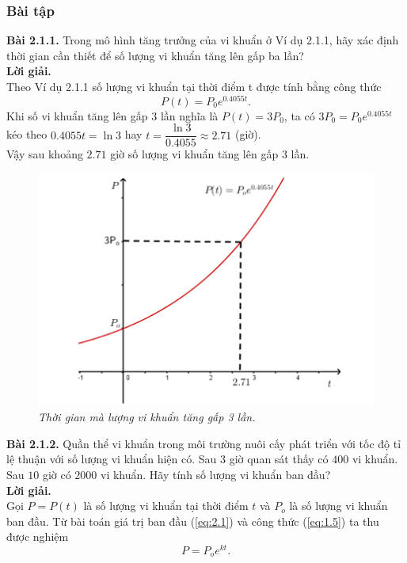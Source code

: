 \subsubsection{Bài tập}
\noindent\textbf{Bài 2.1.1.} Trong mô hình tăng trưởng của vi khuẩn ở Ví dụ 2.1.1, hãy xác định thời gian cần thiết để số lượng vi khuẩn tăng lên gấp ba lần?\\
\textbf{Lời giải. }\\
Theo Ví dụ 2.1.1 số lượng vi khuẩn tại thời điểm t được tính bằng công thức $$P(t)={{P}_{0}}{{e}^{0.4055t}}.$$
Khi số vi khuẩn tăng lên gấp $3$ lần nghĩa là $P(t)=3{{P}_{0}}$, ta có $3{{P}_{0}}={{P}_{0}}{{e}^{0.4055t}}$ kéo theo $0.4055t = \ln 3$ hay $t=\dfrac{\ln 3}{0.4055}\approx 2.71$ (giờ).\\
Vậy sau khoảng $2.71$ giờ số lượng vi khuẩn tăng lên gấp $3$ lần.
\begin{figure}[H]
	\centering
	\includegraphics[scale=0.55]{Images/hinh_2_1.png}
	\caption[Thời gian mà lượng vi khuẩn tăng gấp 3 lần.]{\itshape\fontsize{13pt}{0pt}\selectfont Thời gian mà lượng vi khuẩn tăng gấp 3 lần.}
	\label{hinh2.1}
\end{figure}
\noindent\textbf{Bài 2.1.2.} Quần thể vi khuẩn trong môi trường nuôi cấy phát triển với tốc độ tỉ lệ thuận với số lượng vi khuẩn hiện có. Sau $3 $ giờ quan sát thấy có $400$ vi khuẩn. Sau $10$ giờ có $2000$ vi khuẩn. Hãy tính số lượng vi khuẩn ban đầu?\\
\textbf{Lời giải.} \\ Gọi $P=P(t)$ là số lượng vi khuẩn tại thời điểm $t$ và $P_o$ là số lượng vi khuẩn ban đầu. Từ bài toán giá trị ban đầu (\ref{eq:2.1}) và công thức (\ref{eq:1.5}) ta thu được nghiệm  $$P={{P}_{o}}{{e}^{kt}}.$$  
